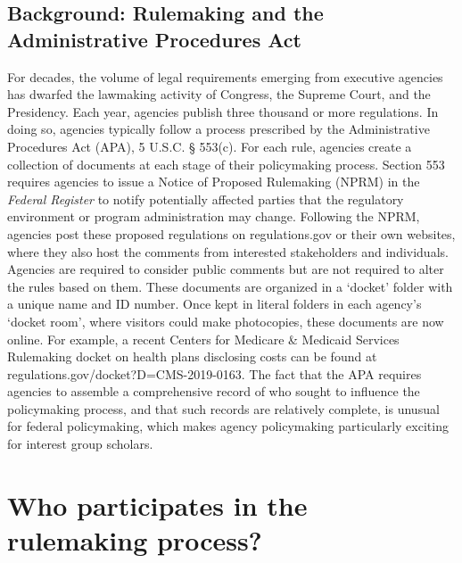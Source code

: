\documentclass[
      12pt,
        ]{article}
\begin{document}
\hypertarget{background-rulemaking-and-the-administrative-procedures-act}{%
\subsection{Background: Rulemaking and the Administrative Procedures
Act}\label{background-rulemaking-and-the-administrative-procedures-act}}

For decades, the volume of legal requirements emerging from executive
agencies has dwarfed the lawmaking activity of Congress, the Supreme
Court, and the Presidency. Each year, agencies publish three thousand or
more regulations. In doing so, agencies typically follow a process
prescribed by the Administrative Procedures Act (APA), 5 U.S.C. §
553(c). For each rule, agencies create a collection of documents at each
stage of their policymaking process. Section 553 requires agencies to
issue a Notice of Proposed Rulemaking (NPRM) in the \emph{Federal
Register} to notify potentially affected parties that the regulatory
environment or program administration may change. Following the NPRM,
agencies post these proposed regulations on regulations.gov or their own
websites, where they also host the comments from interested stakeholders
and individuals. Agencies are required to consider public comments but
are not required to alter the rules based on them. These documents are
organized in a `docket' folder with a unique name and ID number. Once
kept in literal folders in each agency's `docket room', where visitors
could make photocopies, these documents are now online. For example, a
recent Centers for Medicare \& Medicaid Services Rulemaking docket on
health plans disclosing costs can be found at
regulations.gov/docket?D=CMS-2019-0163. The fact that the APA requires
agencies to assemble a comprehensive record of who sought to influence
the policymaking process, and that such records are relatively complete,
is unusual for federal policymaking, which makes agency policymaking
particularly exciting for interest group scholars.

\hypertarget{who-participates-in-the-rulemaking-process}{%
\section{Who participates in the rulemaking
process?}\label{who-participates-in-the-rulemaking-process}}
\end{document}
